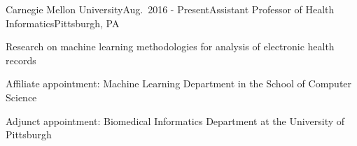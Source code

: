 \begin{rSubsection}{Carnegie Mellon University}{Aug.\ 2016 - Present}{Assistant Professor of Health Informatics}{Pittsburgh, PA}
\item Research on machine learning methodologies for analysis of electronic health records
\item Affiliate appointment: Machine Learning Department in the School of Computer Science
\item Adjunct appointment: Biomedical Informatics Department at the University of Pittsburgh
\end{rSubsection}


